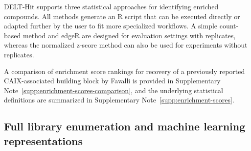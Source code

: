 \documentclass[pdflatex,sn-nature]{sn-jnl}
\begin{document}
DELT-Hit supports three statistical approaches for identifying enriched compounds. All methods generate an R script that can be executed directly or adapted further by the user to fit more specialized workflows. A simple count-based method and edgeR are designed for evaluation settings with replicates, whereas the normalized z-score method can also be used for experiments without replicates.




A comparison of enrichment score rankings for recovery of a previously reported CAIX-associated building block by Favalli \cite{favalli_stereoregiodefineddnaencoded_2021} is provided in Supplementary Note~\ref{supp:enrichment-scores-comparison}, and the underlying statistical definitions are summarized in Supplementary Note~\ref{supp:enrichment-scores}.

\subsection{Full library enumeration and machine learning representations}
\end{document}
